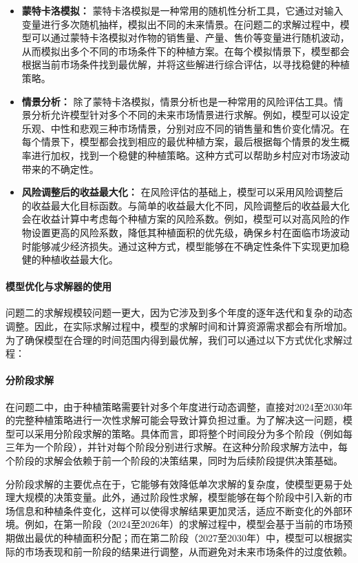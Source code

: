 \documentclass[12pt,a4paper]{nmmcm}
\begin{document}
\begin{itemize}
  \item \textbf{蒙特卡洛模拟：} 蒙特卡洛模拟是一种常用的随机性分析工具，它通过对输入变量进行多次随机抽样，模拟出不同的未来情景。在问题二的求解过程中，模型可以通过蒙特卡洛模拟对作物的销售量、产量、售价等变量进行随机波动，从而模拟出多个不同的市场条件下的种植方案。在每个模拟情景下，模型都会根据当前市场条件找到最优解，并将这些解进行综合评估，以寻找稳健的种植策略。

  \item \textbf{情景分析：} 除了蒙特卡洛模拟，情景分析也是一种常用的风险评估工具。情景分析允许模型针对多个不同的未来市场情景进行求解。例如，模型可以设定乐观、中性和悲观三种市场情景，分别对应不同的销售量和售价变化情况。在每个情景下，模型都会找到相应的最优种植方案，最后根据每个情景的发生概率进行加权，找到一个稳健的种植策略。这种方式可以帮助乡村应对市场波动带来的不确定性。

  \item \textbf{风险调整后的收益最大化：} 在风险评估的基础上，模型可以采用风险调整后的收益最大化目标函数。与简单的收益最大化不同，风险调整后的收益最大化会在收益计算中考虑每个种植方案的风险系数。例如，模型可以对高风险的作物设置更高的风险系数，降低其种植面积的优先级，确保乡村在面临市场波动时能够减少经济损失。通过这种方式，模型能够在不确定性条件下实现更加稳健的种植收益最大化。
\end{itemize}

\paragraph{模型优化与求解器的使用}

问题二的求解规模较问题一更大，因为它涉及到多个年度的逐年迭代和复杂的动态调整。因此，在实际求解过程中，模型的求解时间和计算资源需求都会有所增加。为了确保模型在合理的时间范围内得到最优解，我们可以通过以下方式优化求解过程：

\paragraph{分阶段求解}

在问题二中，由于种植策略需要针对多个年度进行动态调整，直接对2024至2030年的完整种植策略进行一次性求解可能会导致计算负担过重。为了解决这一问题，模型可以采用分阶段求解的策略。具体而言，即将整个时间段分为多个阶段（例如每三年为一个阶段），并针对每个阶段分别进行求解。在这种分阶段求解方法中，每个阶段的求解会依赖于前一个阶段的决策结果，同时为后续阶段提供决策基础。

分阶段求解的主要优点在于，它能够有效降低单次求解的复杂度，使模型更易于处理大规模的决策变量。此外，通过阶段性求解，模型能够在每个阶段中引入新的市场信息和种植条件变化，这样可以使得求解结果更加灵活，适应不断变化的外部环境。例如，在第一阶段（2024至2026年）的求解过程中，模型会基于当前的市场预期做出最优的种植面积分配；而在第二阶段（2027至2030年）中，模型可以根据实际的市场表现和前一阶段的结果进行调整，从而避免对未来市场条件的过度依赖。
\end{document}
